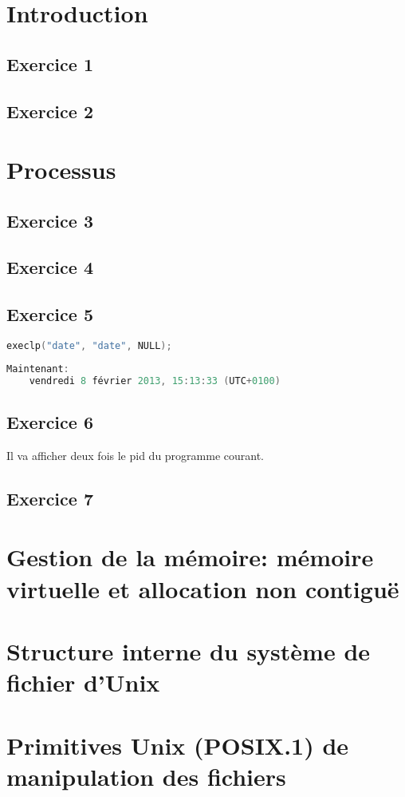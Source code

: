 \documentclass[12pt,a4paper,openany]{book}
\begin{document}
	\setcounter{tocdepth}{2}
	\setcounter{secnumdepth}{3}
	\maketitle
	\tableofcontents
	\chapter{Introduction}
		\section{Exercice 1}
		
		
		\section{Exercice 2}
		
		
	\chapter{Processus}
		\section{Exercice 3}
		
		\section{Exercice 4}
		
		\section{Exercice 5}
\begin{lstlisting}[language=C, numbers=none]
execlp("date", "date", NULL);
\end{lstlisting}
\begin{lstlisting}[language=C, numbers=none]
	Maintenant: 
	vendredi 8 février 2013, 15:13:33 (UTC+0100)
\end{lstlisting}
		\section{Exercice 6}
		Il va afficher deux fois le pid du programme courant.
		\section{Exercice 7}
	\chapter{Gestion de la mémoire: mémoire virtuelle et allocation non contiguë}
	\chapter{Structure interne du système de fichier d'Unix}
	\chapter{Primitives Unix (POSIX.1) de manipulation des fichiers}
\end{document}
